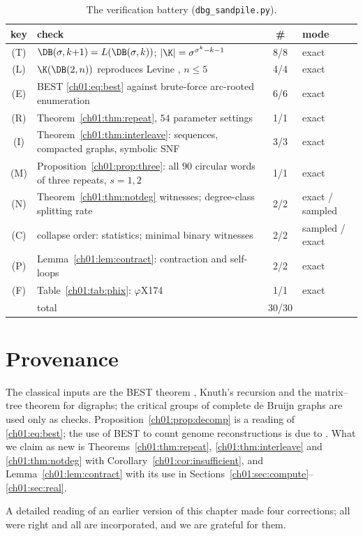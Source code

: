 \begin{table}[ht]
\centering\small
\begin{tabular}{clcl}
\toprule
key & check & \# & mode\\
\midrule
(T) & $\DB(\sigma,k{+}1)=L(\DB(\sigma,k))$; $|\K|=\sigma^{\sigma^{k}-k-1}$ & 8/8 & exact\\
(L) & $\K(\DB(2,n))$ reproduces Levine \cite{Levine}, $n\le5$ & 4/4 & exact\\
(E) & BEST \eqref{ch01:eq:best} against brute-force arc-rooted enumeration & 6/6 & exact\\
(R) & Theorem~\ref{ch01:thm:repeat}, $54$ parameter settings & 1/1 & exact\\
(I) & Theorem~\ref{ch01:thm:interleave}: sequences, compacted graphs, symbolic SNF & 3/3 & exact\\
(M) & Proposition~\ref{ch01:prop:three}: all $90$ circular words of three repeats, $s=1,2$ & 1/1 & exact\\
(N) & Theorem~\ref{ch01:thm:notdeg} witnesses; degree-class splitting rate & 2/2 & exact / sampled\\
(C) & collapse order: statistics; minimal binary witnesses & 2/2 & sampled / exact\\
(P) & Lemma~\ref{ch01:lem:contract}: contraction and self-loops & 2/2 & exact\\
(F) & Table~\ref{ch01:tab:phix}: $\varphi$X174 & 1/1 & exact\\
\midrule
 & total & 30/30 & \\
\bottomrule
\end{tabular}
\caption{The verification battery (\texttt{dbg\_sandpile.py}).}
\label{ch01:tab:battery}
\end{table}

\section*{Provenance}

The classical inputs are the BEST theorem \cite{BEST,SmithTutte},
Knuth's recursion \cite{Knuth} and the matrix--tree theorem for digraphs; the critical
groups of complete de Bruijn graphs \cite{Levine,BidkhoriKishore,CHP} are used only as
checks. Proposition~\ref{ch01:prop:decomp} is a reading of \eqref{ch01:eq:best}; the use of BEST to
count genome reconstructions is due to \cite{KSP}. What we claim as new is
Theorems~\ref{ch01:thm:repeat}, \ref{ch01:thm:interleave} and \ref{ch01:thm:notdeg} with
Corollary~\ref{ch01:cor:insufficient}, and Lemma~\ref{ch01:lem:contract} with its use in
Sections~\ref{ch01:sec:compute}--\ref{ch01:sec:real}.

A detailed reading of an earlier version of this chapter made four corrections; all were
right and all are incorporated, and we are grateful for them.

